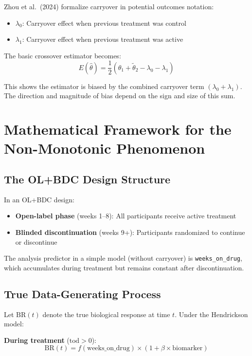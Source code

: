 \documentclass[11pt,a4paper]{article}
\begin{document}
Zhou et al.\ (2024) formalize carryover in potential outcomes notation:
\begin{itemize}
    \item $\lambda_0$: Carryover effect when previous treatment was control
    \item $\lambda_1$: Carryover effect when previous treatment was active
\end{itemize}

The basic crossover estimator becomes:
\begin{equation}
E(\hat{\theta}) = \frac{1}{2}(\theta_1 + \tilde{\theta}_2 - \lambda_0 - \lambda_1)
\end{equation}

This shows the estimator is biased by the combined carryover term $(\lambda_0 + \lambda_1)$.
The direction and magnitude of bias depend on the sign and size of this sum.

\section{Mathematical Framework for the Non-Monotonic Phenomenon}

\subsection{The OL+BDC Design Structure}

In an OL+BDC design:
\begin{itemize}
    \item \textbf{Open-label phase} (weeks 1--8): All participants receive active treatment
    \item \textbf{Blinded discontinuation} (weeks 9+): Participants randomized to continue
          or discontinue
\end{itemize}

The analysis predictor in a simple model (without carryover) is \texttt{weeks\_on\_drug},
which accumulates during treatment but remains constant after discontinuation.

\subsection{True Data-Generating Process}

Let $\text{BR}(t)$ denote the true biological response at time $t$. Under the
Hendrickson model:

\textbf{During treatment} ($\text{tod} > 0$):
\begin{equation}
\text{BR}(t) = f(\text{weeks\_on\_drug}) \times (1 + \beta \times \text{biomarker})
\end{equation}
\end{document}
